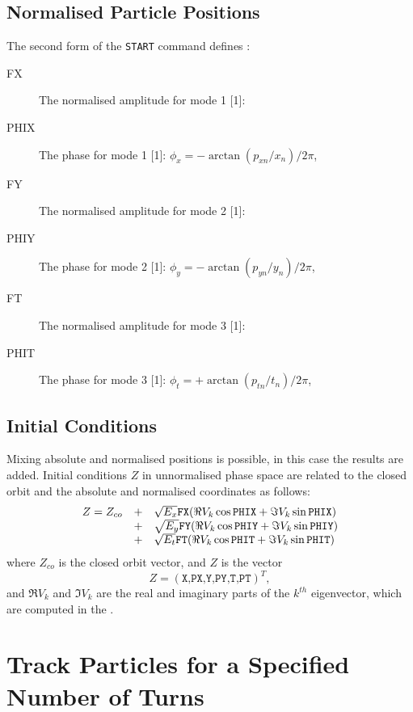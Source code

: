 \subsection{Normalised Particle Positions}
The second form of the \texttt{START} command defines 
:
\begin{description}
\item[FX]
  The normalised amplitude for mode 1 [1]:
\item[PHIX]
  The phase for mode 1 [1]:
  $\phi_x = - \arctan(p_{xn}/x_n) / 2 \pi$,
\item[FY]
  The normalised amplitude for mode 2 [1]:
\item[PHIY]
  The phase for mode 2 [1]:
  $\phi_y = - \arctan(p_{yn}/y_n) / 2 \pi$,
\item[FT]
  The normalised amplitude for mode 3 [1]:
\item[PHIT]
  The phase for mode 3 [1]:
  $\phi_t = + \arctan(p_{tn}/t_n) / 2 \pi$,
\end{description}

\subsection{Initial Conditions}
Mixing absolute and normalised positions is possible,
in this case the results are added.
Initial conditions $Z$ in unnormalised phase space are related 
to the closed orbit and the absolute and normalised coordinates as follows:
\[
\begin{array}{rcl}
  Z = Z_{co}&+& \sqrt{E_x} \hbox{\tt FX}
  (\Re V_k \cos \hbox{\tt PHIX} + \Im V_k \sin \hbox{\tt PHIX}) \\
  &+& \sqrt{E_y} \hbox{\tt FY}
  (\Re V_k \cos \hbox{\tt PHIY} + \Im V_k \sin \hbox{\tt PHIY}) \\
  &+& \sqrt{E_t} \hbox{\tt FT}
  (\Re V_k \cos \hbox{\tt PHIT} + \Im V_k \sin \hbox{\tt PHIT})
\end{array}
\]
where $Z_{co}$ is the closed orbit vector, and $Z$ is the vector 
\[
Z = (\texttt{X,PX,Y,PY,T,PT})^T,
\]
and $\Re V_k$ and $\Im V_k$ are the real and imaginary parts of the 
$k^{th}$ eigenvector,
which are computed in the .

\section{Track Particles for a Specified Number of Turns}
\label{sec:trackrun}

